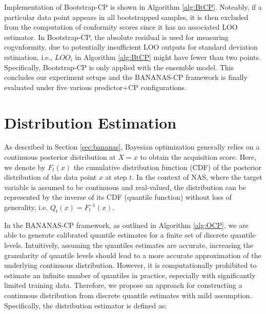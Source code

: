 \documentclass[a4paper,oneside,bibliography=totoc]{scrbook}
\begin{document}
Implementation of Bootstrap-CP is shown in Algorithm \ref{alg:BtCP}. Noteably, if a particular  data point appears in all bootstrapped samples, it is then excluded from the computation of conformity scores since it has no associated LOO estimator. In Bootstrap-CP, the absolute residual is used for measuring cogvnformity, due to potentially insufficient LOO outputs for standard deviation estimation, i.e., $LOO_i$ in Algorithm \ref{alg:BtCP} might have fewer than two points. Specifically, Bootstrap-CP is only applied with the ensemble model. This concludes our experiment setups and the BANANAS-CP framework is finally evaluated under five various predictor+CP configurations.


\section{Distribution Estimation}
\label{sec:distest}
As described in Section \ref{sec:bananas}, Bayesian optimization generally relies on a continuous posterior distribution at $X=x$ to obtain the acquisition score. Here, we denote by $F_t(x)$ the cumulative distribution function (CDF) of the posterior distribution of the data point $x$ at step $t$. In the context of NAS, where the target variable is assumed to be continuous and real-valued, the distribution can be represented by the inverse of its CDF (quantile function) without loss of generality, i.e. $Q_{t}(x) = F^{-1}_{t}(x)$. 

In the BANANAS-CP framework, as outlined in Algorithm \ref{alg:OCP}, we are able to generate calibrated quantile estimates for a finite set of discrete quantile levels. Intuitively, assuming the quantiles estimates are accurate, increasing the granularity of quantile levels should lead to a more accurate approximation of the underlying continuous distribution. However, it is computationally prohibited to estimate an infinite number of quantiles in practice, especially with significantly limited training data. Therefore, we propose an approach for constructing a continuous distribution from discrete quantile estimates with mild assumption. Specifically, the distribution estimator is defined as:
\end{document}
